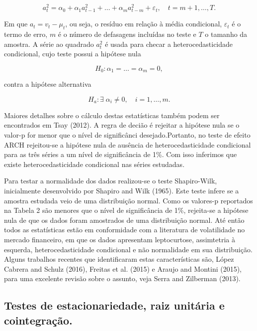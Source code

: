 \begin{equation}
a_t^2=\alpha_0+\alpha_1a_{t-1}^2+\ldots+\alpha_ma_{t-m}^2+\varepsilon_t,\quad t=m+1,\ldots,T.
\end{equation}

Em que \(a_t=v_t-\mu_t\), ou seja, o resíduo em relação à média
condicional, \(\varepsilon_t\) é o termo de erro, \(m\) é o número de
defasagens incluídas no teste e \(T\) o tamanho da amostra. A série ao
quadrado \(a_t^2\) é usada para checar a heterocedasticidade
condicional, cujo teste possui a hipótese nula

\begin{equation}
H_0:\alpha_1=\ldots=\alpha_m=0,
\end{equation}

contra a hipótese alternativa

\begin{equation}
H_a:\exists \; \alpha_i\neq 0, \quad i=1,\ldots,m.
\end{equation}

Maiores detalhes sobre o cálculo destas estatísticas também podem ser
encontrados em Tsay (2012). A regra de decião é rejeitar a hipótese nula
se o valor-p for menor que o nível de significânci desejado.Portanto, no
teste de efeito ARCH rejeitou-se a hipótese nula de ausência de
heterocedasticidade condicional para as três séries a um nível de
significância de 1\%. Com isso inferimos que existe heterocedasticidade
condicional nas séries estudadas.

Para testar a normalidade dos dados realizou-se o teste Shapiro-Wilk,
inicialmente desenvolvido por Shapiro and Wilk (1965). Este teste infere
se a amostra estudada veio de uma distribuição normal. Como os valores-p
reportados na Tabela 2 são menores que o nível de significância de 1\%,
rejeita-se a hipótese nula de que os dados foram amostrados de uma
distribuição normal. Até então todos as estatísticas estão em
conformidade com a literatura de volatilidade no mercado financeiro, em
que os dados apresentam leptocurtose, assimtetria à esquerda,
heterocedasticidade condicional e não normalidade em sua distribuição.
Alguns trabalhos recentes que identificaram estas características são,
López Cabrera and Schulz (2016), Freitas et al. (2015) e Araujo and
Montini (2015), para uma excelente revisão sobre o assunto, veja Serra
and Zilberman (2013).

\subsection{Testes de estacionariedade, raiz unitária e
cointegração.}\label{testes-de-estacionariedade-raiz-unitaria-e-cointegracao.}

